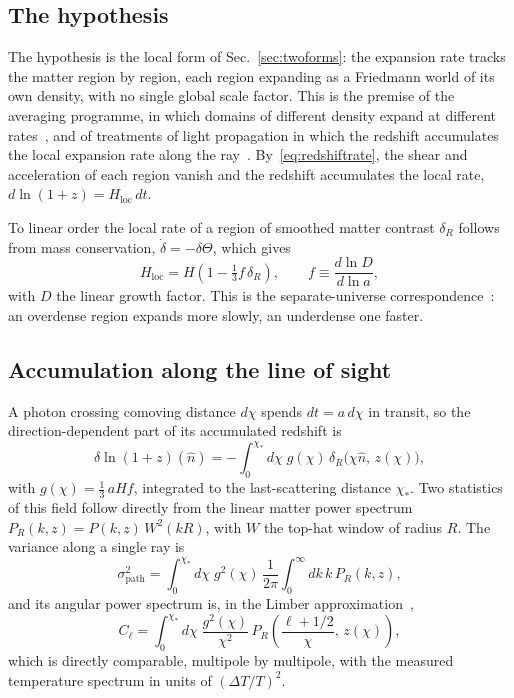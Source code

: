 \documentclass[aps,prd,reprint,amsmath,amssymb,superscriptaddress]{revtex4-2}
\begin{document}
\subsection{The hypothesis}

The hypothesis is the local form of Sec.~\ref{sec:twoforms}: the expansion rate tracks the matter region by region, each region expanding as a Friedmann world of its own density, with no single global scale factor. This is the premise of the averaging programme, in which domains of different density expand at different rates~\cite{Buchert2000}, and of treatments of light propagation in which the redshift accumulates the local expansion rate along the ray~\cite{Rasanen2009}. By~\eqref{eq:redshiftrate}, the shear and acceleration of each region vanish and the redshift accumulates the local rate, $d\ln(1+z)=H_{\mathrm{loc}}\,dt$.

To linear order the local rate of a region of smoothed matter contrast $\delta_R$ follows from mass conservation, $\dot\delta=-\delta\Theta$, which gives
\begin{equation}
H_{\mathrm{loc}} = H\left(1-\tfrac13 f\,\delta_R\right),\qquad f\equiv\frac{d\ln D}{d\ln a},
\label{eq:localrate}
\end{equation}
with $D$ the linear growth factor. This is the separate-universe correspondence~\cite{Peebles1980}: an overdense region expands more slowly, an underdense one faster.

\subsection{Accumulation along the line of sight}

A photon crossing comoving distance $d\chi$ spends $dt=a\,d\chi$ in transit, so the direction-dependent part of its accumulated redshift is
\begin{equation}
\delta\ln(1+z)(\hat n) = -\int_0^{\chi_*} d\chi\; g(\chi)\,\delta_R\big(\chi\hat n,\,z(\chi)\big),
\label{eq:lineint}
\end{equation}
with $g(\chi)=\tfrac13\,aHf$, integrated to the last-scattering distance $\chi_*$. Two statistics of this field follow directly from the linear matter power spectrum $P_R(k,z)=P(k,z)\,W^{2}(kR)$, with $W$ the top-hat window of radius $R$. The variance along a single ray is
\begin{equation}
\sigma^{2}_{\mathrm{path}} = \int_0^{\chi_*} d\chi\; g^{2}(\chi)\,\frac{1}{2\pi}\int_0^\infty dk\,k\,P_R(k,z),
\label{eq:sigmapath}
\end{equation}
and its angular power spectrum is, in the Limber approximation~\cite{Limber1953},
\begin{equation}
C_\ell = \int_0^{\chi_*} d\chi\;\frac{g^{2}(\chi)}{\chi^{2}}\,P_R\!\left(\frac{\ell+1/2}{\chi},\,z(\chi)\right),
\label{eq:limber}
\end{equation}
which is directly comparable, multipole by multipole, with the measured temperature spectrum in units of $(\Delta T/T)^2$.
\end{document}
